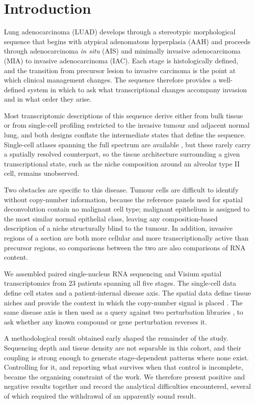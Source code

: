 \section{Introduction}

Lung adenocarcinoma (LUAD) develops through a stereotypic morphological sequence that
begins with atypical adenomatous hyperplasia (AAH) and proceeds through adenocarcinoma
\emph{in situ} (AIS) and minimally invasive adenocarcinoma (MIA) to invasive
adenocarcinoma (IAC). Each stage is histologically defined, and the transition from
precursor lesion to invasive carcinoma is the point at which clinical management changes.
The sequence therefore provides a well-defined system in which to ask what transcriptional
changes accompany invasion and in what order they arise.

Most transcriptomic descriptions of this sequence derive either from bulk tissue
\citep{tcga2014luad} or from single-cell profiling restricted to the invasive tumour and
adjacent normal lung, and both designs conflate the intermediate states that define the
sequence. Single-cell atlases spanning the full spectrum are available \citep{han2024}, but
these rarely carry a spatially resolved counterpart, so the tissue architecture surrounding
a given transcriptional state, such as the niche composition around an alveolar type II
cell, remains unobserved.

Two obstacles are specific to this disease. Tumour cells are difficult to identify without
copy-number information, because the reference panels used for spatial deconvolution
contain no malignant cell type; malignant epithelium is assigned to the most similar normal
epithelial class, leaving any composition-based description of a niche structurally blind
to the tumour. In addition, invasive regions of a section are both more cellular and more
transcriptionally active than precursor regions, so comparisons between the two are also
comparisons of RNA content.

We assembled paired single-nucleus RNA sequencing and Visium spatial transcriptomics from
23 patients spanning all five stages. The single-cell data define cell states and a
patient-internal disease axis. The spatial data define tissue niches
\citep{singhal2024banksy,cable2022rctd} and provide the context in which the copy-number
signal is placed \citep{cabrejas2026fastcnv}. The same disease axis is then used as a query
against two perturbation libraries \citep{subramanian2017}, to ask whether any known
compound or gene perturbation reverses it.

A methodological result obtained early shaped the remainder of the study. Sequencing depth
and tissue density are not separable in this cohort, and their coupling is strong enough to
generate stage-dependent patterns where none exist. Controlling for it, and reporting what
survives when that control is incomplete, became the organising constraint of the work. We
therefore present positive and negative results together and record the analytical
difficulties encountered, several of which required the withdrawal of an apparently sound
result.
